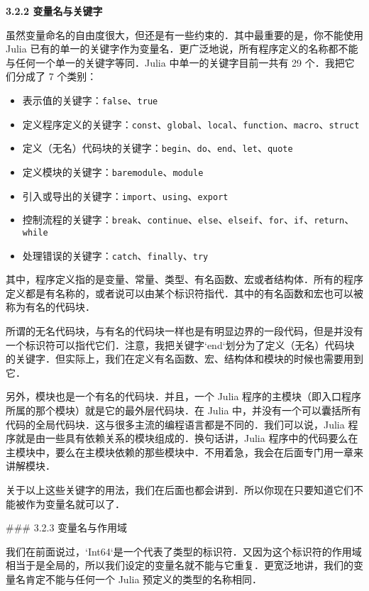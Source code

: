 \textbf{3.2.2 变量名与关键字}

虽然变量命名的自由度很大，但还是有一些约束的．其中最重要的是，你不能使用 Julia 已有的单一的关键字作为变量名．更广泛地说，所有程序定义的名称都不能与任何一个单一的关键字等同．Julia 中单一的关键字目前一共有 29 个．我把它们分成了 7 个类别：

\begin{itemize}
\item 表示值的关键字：\verb|false|、\verb|true|
\item 定义程序定义的关键字：\verb|const|、\verb|global|、\verb|local|、\verb|function|、\verb|macro|、\verb|struct|
\item 定义（无名）代码块的关键字：\verb|begin|、\verb|do|、\verb|end|、\verb|let|、\verb|quote|
\item 定义模块的关键字：\verb|baremodule|、\verb|module|
\item 引入或导出的关键字：\verb|import|、\verb|using|、\verb|export|
\item 控制流程的关键字：\verb|break|、\verb|continue|、\verb|else|、\verb|elseif|、\verb|for|、\verb|if|、\verb|return|、\verb|while|
\item 处理错误的关键字：\verb|catch|、\verb|finally|、\verb|try|
\end{itemize}

其中，程序定义指的是变量、常量、类型、有名函数、宏或者结构体．所有的程序定义都是有名称的，或者说可以由某个标识符指代．其中的有名函数和宏也可以被称为有名的代码块．

所谓的无名代码块，与有名的代码块一样也是有明显边界的一段代码，但是并没有一个标识符可以指代它们．注意，我把关键字`end`划分为了定义（无名）代码块的关键字．但实际上，我们在定义有名函数、宏、结构体和模块的时候也需要用到它．

另外，模块也是一个有名的代码块．并且，一个 Julia 程序的主模块（即入口程序所属的那个模块）就是它的最外层代码块．在 Julia 中，并没有一个可以囊括所有代码的全局代码块．这与很多主流的编程语言都是不同的．我们可以说，Julia 程序就是由一些具有依赖关系的模块组成的．换句话讲，Julia 程序中的代码要么在主模块中，要么在主模块依赖的那些模块中．不用着急，我会在后面专门用一章来讲解模块．

关于以上这些关键字的用法，我们在后面也都会讲到．所以你现在只要知道它们不能被作为变量名就可以了．

### 3.2.3 变量名与作用域

我们在前面说过，`Int64`是一个代表了类型的标识符．又因为这个标识符的作用域相当于是全局的，所以我们设定的变量名就不能与它重复．更宽泛地讲，我们的变量名肯定不能与任何一个 Julia 预定义的类型的名称相同．

